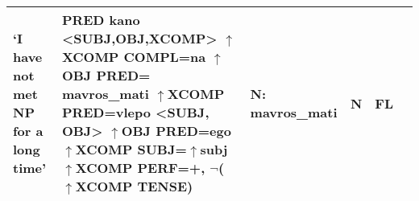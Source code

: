 \begin{table}[p]
{\begin{tabular}{|l|p{5.6cm}|p{6.4cm}|p{3.3cm}|l|l|}
`I have not met NP for a long time’
  &
PRED kano <SUBJ,OBJ,XCOMP> \newline
$\uparrow$XCOMP COMPL=na \newline
$\uparrow$OBJ PRED= mavros\_mati \newline
$\uparrow$XCOMP PRED=vlepo <SUBJ, OBJ> \newline
$\uparrow$OBJ PRED=ego \newline
$\uparrow$XCOMP SUBJ=$\uparrow$subj \newline
$\uparrow$XCOMP PERF=+, $\neg$($\uparrow$XCOMP TENSE)
  &
N: \newline
mavros\_mati
  &
N
  & 
FL
 \\
  \hline
\end{tabular}
}
\end{table}
